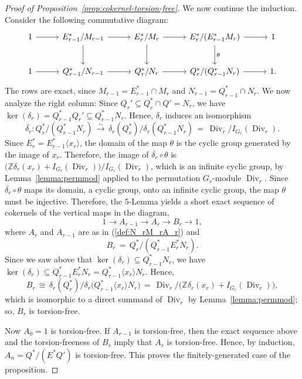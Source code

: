 \documentclass[11pt]{article}
\numberwithin{equation}{section}
\theoremstyle{plain}
\theoremstyle{remark}
\newcommand{\opn}{\operatorname}
\newcommand{\zz}{\mathbb Z}
\newcommand{\ov}{\overline}
\newcommand{\divr}{\opn{Div}_r}
\begin{document}
\begin{proof}[Proof of Proposition~\ref{prop:cokernel-torsion-free}]
We now continue the induction. Consider the following commutative diagram:
$$
\begin{tikzcd}[column sep=2.8em,row sep=2.4em]
1 \arrow[r]
& E_{r-1}^*/M_{r-1} \arrow[r] \arrow[d]
& E_r^*/M_r \arrow[r] \arrow[d]
& E_r^*/(E_{r-1}^*M_r) \arrow[r] \arrow[d,"\theta"]
& 1
\\
1 \arrow[r]
& Q_{r-1}^*/N_{r-1} \arrow[r]
& Q_r^*/N_r \arrow[r]
& Q_r^*/(Q_{r-1}^*N_r) \arrow[r]
& 1 .
\end{tikzcd}
$$
The rows are exact, since $M_{r-1}=E_{r-1}^*\cap M_r$ and $N_{r-1}=Q_{r-1}^*\cap N_r$. We now analyze  the 
right column:  Since $Q_r' \subseteq  Q_r^* \cap Q' = N_r$, we have 
$\opn{ker}(\delta_r) = Q_{r-1}^*Q_r' \subseteq
Q_{r-1}^*N_r$.  Hence, $\delta_r$ induces an isomorphism 
 $$
 \overline{\delta_r}\colon Q_r^*/(Q_{r-1}^*N_r) \,\overset{\sim}{\longrightarrow}\,
   \delta_r(Q_r^*)/\delta_r(Q_{r-1}^*N_r) \,=\, \divr/I_{G_r}(\divr).
   $$
   Since $E_r^* = E_{r-1}^*\langle x_r\rangle$, the domain of the map $\theta$ is the cyclic group generated by 
   the image of $x_r$.  Therefore, the image of $\ov {\delta_r} \circ \theta$ is 
   $\big(\zz\delta_r (x_r)+ I_{G_r}(\divr)\big)\big/I_{G_r}(\divr)$,
   which is an infinite cyclic group, by Lemma~\ref{lemma:permmod} applied to the permutation $G_r$-module
   $\divr$.  Since $\ov {\delta_r} \circ \theta$ maps its domain, a cyclic group,  onto an infinite cyclic group,
   the map $\theta$ must be injective. Therefore,  
the $5$-Lemma yields a short exact sequence of cokernels of the vertical maps in the diagram,
$$
        1\longrightarrow A_{r-1}\longrightarrow A_r\longrightarrow B_r
        \longrightarrow 1,
$$
where $A_r$ and $A_{r-1}$ are as in (\ref{def:N_rM_rA_r}) and 
$$
        B_r\,=\,Q_r^*\big/(Q_{r-1}^*E_r^*N_r).
$$
Since we saw above that $\opn{ker}(\delta_r) \subseteq
Q_{r-1}^*N_r$, we have $\opn{ker}(\delta_r) \subseteq Q_{r-1}^*E_r^*N_r = Q_{r-1}^*\langle x_r \rangle N_r$.
Hence,
$$
B_r \,\cong\,\delta_r(Q_r^*) \big/\delta_r\big(Q_{r-1}^*\langle x_r \rangle N_r\big)
\, =\, \divr\big/\big(\zz\delta_r (x_r)+ I_{G_r}(\divr)\big),
$$
which is isomorphic to a direct summand of $\divr$ by Lemma~\ref{lemma:permmod}; so, $B_r$ is torsion-free.


Now $A_0=1$ is torsion-free. If $A_{r-1}$ is torsion-free, then the exact sequence above and the torsion-freeness of 
$B_r$ imply that $A_r$ is torsion-free. Hence, by induction, $A_n=Q^*/(E^*Q')$ is torsion-free. This proves the
 finitely-generated case of the proposition.


\end{proof}
\end{document}

